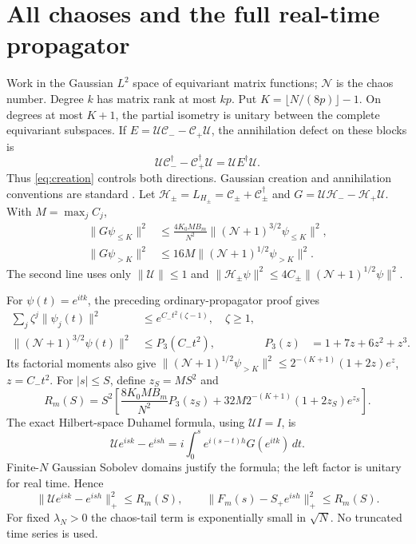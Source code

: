 \documentclass[11pt,a4paper]{article}
\newcommand{\NN}{\mathcal N}
\begin{document}
\newpage
\section{All chaoses and the full real-time propagator}
Work in the Gaussian $L^2$ space of equivariant matrix functions;
$\NN$ is the chaos number. Degree $k$ has matrix rank at most $kp$.
Put $K=\lfloor N/(8p)\rfloor-1$. On degrees at most $K+1$, the
partial isometry is unitary between the complete equivariant
subspaces. If $E=\mathcal U\mathcal C_- -\mathcal C_+\mathcal U$,
the annihilation defect on these blocks is
\begin{equation}
 \mathcal U\mathcal C_-^\dagger-\mathcal C_+^\dagger\mathcal U
 =\mathcal U E^\dagger\mathcal U.
\end{equation}
Thus \eqref{eq:creation} controls both directions. Gaussian
creation and annihilation conventions are standard \cite{ChenLiu}.
Let $\mathcal H_\pm=L_{H_\pm}=\mathcal C_\pm+\mathcal C_\pm^\dagger$
and $G=\mathcal U\mathcal H_- -\mathcal H_+\mathcal U$.
With $M=\max_j C_j$,
\begin{align}
 \|G\psi_{\le K}\|^2
 &\le\frac{4K_0 M B_m}{N^2}\|(\NN+1)^{3/2}\psi_{\le K}\|^2,\\
 \|G\psi_{>K}\|^2
 &\le16M\|(\NN+1)^{1/2}\psi_{>K}\|^2.
\end{align}
The second line uses only $\|\mathcal U\|\le1$ and
$\|\mathcal H_\pm\psi\|^2\le4C_\pm\|(\NN+1)^{1/2}\psi\|^2$.

For $\psi(t)=e^{itk}$, the preceding ordinary-propagator proof gives
\begin{align}
 \sum_j\zeta^j\|\psi_j(t)\|^2&\le e^{C_-t^2(\zeta-1)},\quad\zeta\ge1,\\
 \|(\NN+1)^{3/2}\psi(t)\|^2&\le P_3(C_-t^2),
 &P_3(z)&=1+7z+6z^2+z^3.
\end{align}
Its factorial moments also give
$\|(\NN+1)^{1/2}\psi_{>K}\|^2
\le2^{-(K+1)}(1+2z)e^z$, $z=C_-t^2$.
For $|s|\le S$, define $z_S=MS^2$ and
\begin{equation}
 R_m(S)=S^2\left[
 \frac{8K_0 M B_m}{N^2}P_3(z_S)
 +32M2^{-(K+1)}(1+2z_S)e^{z_S}\right].
\end{equation}
The exact Hilbert-space Duhamel formula, using $\mathcal U I=I$, is
\begin{equation}
 \mathcal Ue^{isk}-e^{ish}
 =i\int_0^s e^{i(s-t)h}G(e^{itk})\,dt.
\end{equation}
Finite-$N$ Gaussian Sobolev domains justify the formula; the left
factor is unitary for real time. Hence
\begin{equation}
 \|\mathcal Ue^{isk}-e^{ish}\|_+^2\le R_m(S),\qquad
 \|F_m(s)-S_+e^{ish}\|_+^2\le R_m(S).
 \label{eq:rankproxy}
\end{equation}
For fixed $\lambda_N>0$ the chaos-tail term is exponentially small
in $\sqrt N$. No truncated time series is used.
\end{document}
